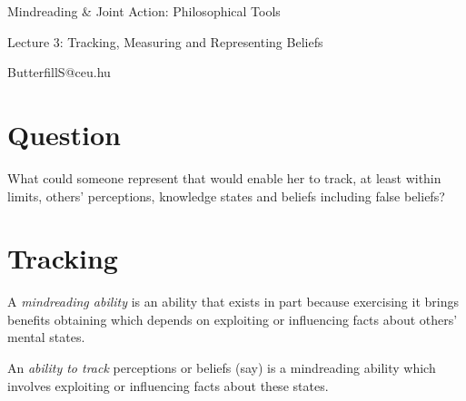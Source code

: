 \documentclass[11pt]{extarticle}
\date{}
\begin{document}
\begin{multicols}{3}

\setlength\footnotesep{1em}









\begin{center}
{\Large
Mindreading \& Joint Action: Philosophical Tools}

Lecture 3: Tracking, Measuring and Representing Beliefs


ButterfillS@ceu.hu
\end{center}

\section{Question}
What could someone represent that would enable her to track, at least within limits, others' perceptions, knowledge states and beliefs including false beliefs? 


\section{Tracking}

A \emph{mindreading ability} is an ability that exists in part because exercising it brings benefits obtaining which depends on exploiting or influencing facts about others’ mental states.  

An \textit{ability to track} perceptions or beliefs (say) is a mindreading ability which involves exploiting or influencing facts about these states.





\end{multicols}
\end{document}
